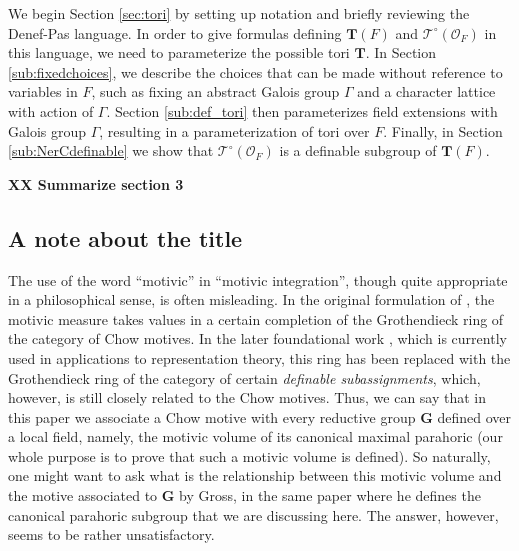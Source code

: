 \documentclass{amsart}
\newcommand{\ri}{\mathcal{O}}
\newcommand{\bG}{\mathbf{G}}
\newcommand{\bT}{\mathbf {T}}
\newcommand{\NerC}[1]{\mathcal{#1}^\circ}
\theoremstyle{plain}
\theoremstyle{definition}
\begin{document}
We begin Section \ref{sec:tori} by setting up notation and briefly reviewing the Denef-Pas language.  In order
to give formulas defining $\bT(F)$ and $\NerC{T}(\ri_F)$ in this language, we need to parameterize the possible tori $\bT$.
In Section \ref{sub:fixedchoices}, we describe the choices that can be made without reference to variables in $F$,
such as fixing an abstract Galois group $\Gamma$ and a character lattice with action of $\Gamma$.
Section \ref{sub:def_tori} then parameterizes field extensions with Galois group $\Gamma$, resulting in a parameterization
of tori over $F$.  Finally, in Section \ref{sub:NerCdefinable} we show that $\NerC{T}(\ri_F)$ is a definable subgroup of $\bT(F)$.

{\bf XX Summarize section 3}
\subsection{A note about the title}
The use of the word ``motivic'' in ``motivic integration'', though quite appropriate in a philosophical sense, is often misleading. In the original formulation of \cite{denef-loeser:p-adic}, the motivic measure takes values in a certain completion of the Grothendieck ring of the category of Chow motives. 
In the later foundational work \cite{cluckers-loeser}, which is currently used in applications to representation theory, 
this ring has been replaced with the Grothendieck ring of the category of certain  \emph{definable subassignments}, which, however, is still closely related to the Chow motives. 
Thus, we can say that in this paper we associate a Chow motive with every reductive group $\bG$ defined over a local field, namely, the motivic volume of its canonical maximal parahoric (our whole purpose is to prove that such a motivic volume is defined). So naturally, one might want to ask what is the relationship between this motivic volume and the motive associated to $\bG$ by Gross, in the same paper \cite{gross:motive} where he defines the canonical parahoric subgroup that we are discussing here. 
The  answer, however, seems to be rather unsatisfactory. 
\end{document}

